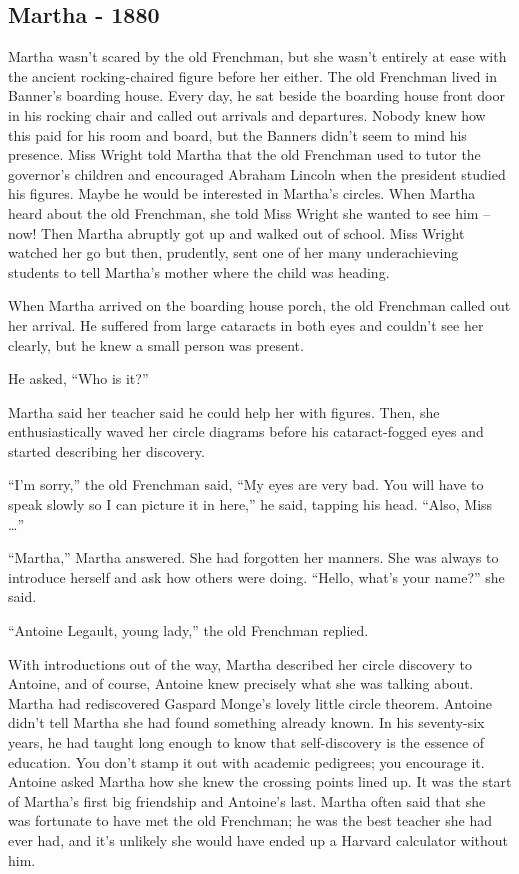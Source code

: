 \hypertarget{martha---1880}{%
\subsection*{Martha - 1880}\label{martha---1880}}

Martha wasn't scared by the old Frenchman, but she wasn't entirely at
ease with the ancient rocking-chaired figure before her either. The old
Frenchman lived in Banner's boarding house. Every day, he sat beside the
boarding house front door in his rocking chair and called out arrivals
and departures. Nobody knew how this paid for his room and board, but
the Banners didn't seem to mind his presence. Miss Wright told Martha
that the old Frenchman used to tutor the governor's children and
encouraged Abraham Lincoln when the president studied his figures. Maybe
he would be interested in Martha's circles. When Martha heard about the
old Frenchman, she told Miss Wright she wanted to see him -- now! Then
Martha abruptly got up and walked out of school. Miss Wright watched her
go but then, prudently, sent one of her many underachieving students to
tell Martha's mother where the child was heading.

When Martha arrived on the boarding house porch, the old Frenchman
called out her arrival. He suffered from large cataracts in both eyes
and couldn't see her clearly, but he knew a small person was present.

He asked, ``Who is it?''

Martha said her teacher said he could help her with figures. Then, she
enthusiastically waved her circle diagrams before his cataract-fogged
eyes and started describing her discovery.

``I'm sorry,'' the old Frenchman said, ``My eyes are very bad. You will
have to speak slowly so I can picture it in here,'' he said, tapping his
head. ``Also, Miss \ldots''

``Martha,'' Martha answered. She had forgotten her manners. She was
always to introduce herself and ask how others were doing. ``Hello,
what's your name?'' she said.

``Antoine Legault, young lady,'' the old Frenchman replied.

With introductions out of the way, Martha described her circle discovery
to Antoine, and of course, Antoine knew precisely what she was talking
about. Martha had rediscovered Gaspard Monge's lovely little circle
theorem. Antoine didn't tell Martha she had found something already
known. In his seventy-six years, he had taught long enough to know that
self-discovery is the essence of education. You don't stamp it out with
academic pedigrees; you encourage it. Antoine asked Martha how she knew
the crossing points lined up. It was the start of Martha's first big
friendship and Antoine's last. Martha often said that she was fortunate
to have met the old Frenchman; he was the best teacher she had ever had,
and it's unlikely she would have ended up a Harvard calculator without
him.

